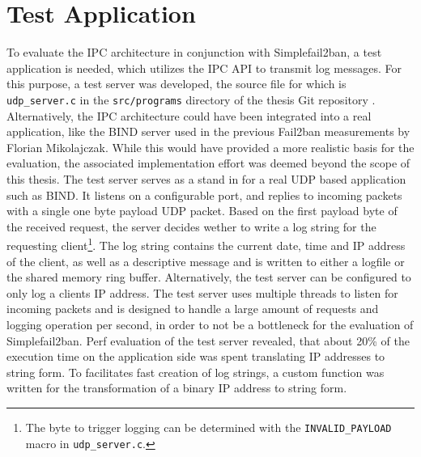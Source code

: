 \section{Test Application}
\label{sec:test_server}

To evaluate the \ac{IPC} architecture in conjunction with Simplefail2ban, a test application is needed, which utilizes the \ac{IPC} API to transmit log
messages. For this purpose, a test server was developed, the source file for which is \texttt{udp\_server.c} in the \texttt{src/programs} directory of the thesis Git repository \cite{gitlab}. 
Alternatively, the \ac{IPC} architecture could have been integrated into a real application, like the BIND server used in the previous Fail2ban measurements by Florian Mikolajczak. While this would have provided a more 
realistic basis for the evaluation, the associated implementation effort was deemed beyond the scope of this thesis. 
The test server serves as a stand in for a real \ac{UDP} based application such as BIND. It listens on a configurable port,
and replies to incoming packets with a single one byte payload UDP packet. Based on the first payload byte of the received request,
the server decides wether to write a log string for the requesting client\footnote{The byte to trigger logging can be determined with the \texttt{INVALID\_PAYLOAD} macro in \texttt{udp\_server.c}.}.
The log string contains the current date, time and \ac{IP} address of the client, as well as a descriptive message and is written to either a logfile or the shared memory ring buffer.  
Alternatively, the test server can be configured to only log a clients \ac{IP} address. The test server uses multiple threads to listen for incoming packets 
and is designed to handle a large amount of requests and logging operation per second, in order to not be a bottleneck for the evaluation of Simplefail2ban. 
Perf \cite{perf} evaluation of the test server revealed, that about 20\% of the execution time on the application side was spent translating \ac{IP} addresses to string form.  
To facilitates fast creation of log strings, a custom function was written for the transformation of a binary \ac{IP} address to string form. 
